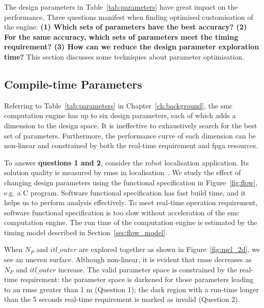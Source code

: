The design parameters in Table~\ref{tab:parameters} have great impact on the performance.
Three questions manifest when finding optimised customisation of the engine:
\textbf{(1) Which sets of parameters have the best accuracy?
(2) For the same accuracy, which sets of parameters meet the timing requirement?
(3) How can we reduce the design parameter exploration time?}
This section discusses some techniques about parameter optimisation.

\subsection{Compile-time Parameters}
\label{sec:flow_parameters}

Referring to Table~\ref{tab:parameters} in Chapter~\ref{ch:background}, the \gls{smc} computation engine has up to six design parameters, each of which adds a dimension to the design space.
It is ineffective to exhaustively search for the best set of parameters.
Furthermore, the performance curve of each dimension can be non-linear and constrained by both the real-time requirement and \gls{fpga} resources.

To answer \textbf{questions 1 and 2}, consider the robot localisation application.
Its solution quality is measured by \gls{rmse} in localisation~\cite{montemerlo02}.
We study the effect of changing design parameters using the functional specification in Figure~\ref{fig:flow}, e.g. a C program.
Software functional specification has fast build time, and it helps us to perform analysis effectively.
To meet real-time operation requirement, software functional specification is too slow without acceleration of the \gls{smc} computation engine.
The run time of the computation engine is estimated by the timing model described in Section~\ref{sec:flow_model}.

When $N_P$ and $itl\_outer$ are explored together as shown in Figure~\ref{fig:mcl_2d}, we see an uneven surface.
Although non-linear, it is evident that \gls{rmse} decreases as $N_P$ and $itl\_outer$ increase.
The valid parameter space is constrained by the real-time requirement:
the parameter space is darkened for those parameters leading to an \gls{rmse} greater than 1 m (Question 1);
the dark region with a run-time longer than the 5 seconds real-time requirement is marked as invalid (Question 2).

